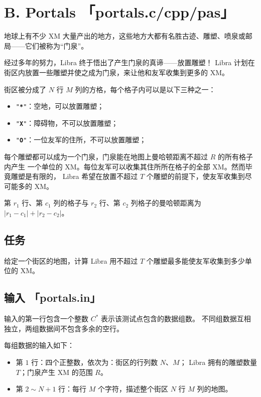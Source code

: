 \documentclass[UTF8, 11pt, a4paper]{article}
\begin{document}

\section*{B. \makebox[1em]{} Portals \makebox[2.5em]{} \small{「portals.c/cpp/pas」}}
地球上有不少 XM 大量产出的地方，这些地方大都有名胜古迹、雕塑、喷泉或邮局——它们被称为“门泉”。

经过多年的努力，Libra 终于悟出了产生门泉的真谛——放置雕塑！%
Libra 计划在街区内放置一些雕塑并使之成为门泉，来让他和友军收集到更多的 XM。

街区被分成了 $N$ 行 $M$ 列的方格，每个格子内可以是以下三种之一：
\begin{itemize}
    \item \texttt{"\textbf{*}"}：空地，可以放置雕塑；
    \item \texttt{"\textbf{X}"}：障碍物，不可以放置雕塑；
    \item \texttt{"\textbf{O}"}：一位友军的住所，不可以放置雕塑；
\end{itemize}

每个雕塑都可以成为一个门泉，门泉能在地图上曼哈顿距离不超过 $R$ 的所有格子内产生%
一个单位的 XM。每位友军可以收集其住所所在格子的全部 XM。然而毕竟雕塑是有限的，%
Libra 希望在放置不超过 $T$ 个雕塑的前提下，使友军收集到尽可能多的 XM。

第 $r_1$ 行、第 $c_1$ 列的格子与 $r_2$ 行、第 $c_2$ 列格子的曼哈顿距离为%
$|r_1 - c_1| + |r_2 - c_2|$。

\subsection*{任务}
给定一个街区的地图，计算 Libra 用不超过 $T$ 个雕塑最多能使友军收集到多少单位的 XM。

\subsection*{输入 \makebox[0.5em]{} \small{「portals.in」}}
输入的第一行包含一个整数 $C^*$ 表示该测试点包含的数据组数。%
不同组数据互相独立，两组数据间不包含多余的空行。

每组数据的输入如下：
\begin{itemize}
    \item 第 $1$ 行：四个正整数，依次为：街区的行列数 $N$、$M$；
        Libra 拥有的雕塑数量 $T$；门泉产生 XM 的范围 $R$。
    \item 第 $2 \sim N+1$ 行：每行 $M$ 个字符，描述整个街区 $N$ 行 $M$ 列的地图。
\end{itemize}
\end{document}
